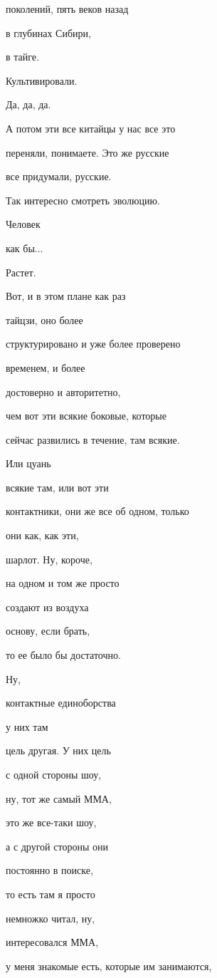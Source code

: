 поколений, пять веков назад

в глубинах Сибири,

в тайге.

Культивировали.

Да, да, да.

А потом эти все китайцы у нас все это

переняли, понимаете. Это же русские

все придумали, русские.

Так интересно смотреть эволюцию.

Человек

как бы...

Растет.

Вот, и в этом плане как раз

тайцзи, оно более

структурировано и уже более проверено

временем, и более

достоверно и авторитетно,

чем вот эти всякие боковые, которые

сейчас развились в течение, там всякие.

Или цуань

всякие там, или вот эти

контактники, они же все об одном, только

они как, как эти,

шарлот. Ну, короче,

на одном и том же просто

создают из воздуха

основу, если брать,

то ее было бы достаточно.

Ну,

контактные единоборства

у них там

цель другая. У них цель

с одной стороны шоу,

ну, тот же самый ММА,

это же все-таки шоу,

а с другой стороны они

постоянно в поиске,

то есть там я просто

немножко читал, ну,

интересовался ММА,

у меня знакомые есть, которые им занимаются,

